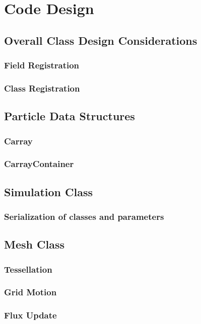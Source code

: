 \section{Code Design}
\subsection{Overall Class Design Considerations}
\subsubsection{Field Registration}
\subsubsection{Class Registration}

\subsection{Particle Data Structures}
\subsubsection{Carray}
\subsubsection{CarrayContainer}

\subsection{Simulation Class}
\subsubsection{Serialization of classes and parameters}

\subsection{Mesh Class}
\subsubsection{Tessellation}
\subsubsection{Grid Motion}
\subsubsection{Flux Update}

